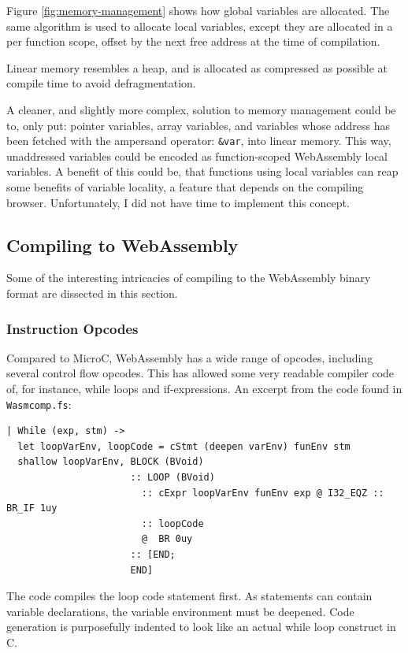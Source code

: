 \documentclass[a4paper]{article}
\begin{document}
Figure \ref{fig:memory-management} shows how global variables are allocated. The same algorithm is used to allocate local variables, except they are allocated in a per function scope, offset by the next free address at the time of compilation.

Linear memory resembles a heap, and is allocated as compressed as possible at compile time to avoid defragmentation.

A cleaner, and slightly more complex, solution to memory management could be to, only put: pointer variables, array variables, and variables whose address has been fetched with the ampersand operator: \texttt{\&var}, into linear memory. This way, unaddressed variables could be encoded as function-scoped WebAssembly local variables. A benefit of this could be, that functions using local variables can reap some benefits of variable locality, a feature that depends on the compiling browser. Unfortunately, I did not have time to implement this concept.

\newpage
\subsection{Compiling to WebAssembly}
\label{sec:technical:webassembly}
Some of the interesting intricacies of compiling to the WebAssembly binary format are dissected in this section.

\subsubsection{Instruction Opcodes}
Compared to MicroC, WebAssembly has a wide range of opcodes, including several control flow opcodes. This has allowed some very readable compiler code of, for instance, while loops and if-expressions.
An excerpt from the code found in \texttt{Wasmcomp.fs}:
\begin{verbatim}
| While (exp, stm) ->
  let loopVarEnv, loopCode = cStmt (deepen varEnv) funEnv stm
  shallow loopVarEnv, BLOCK (BVoid)
                      :: LOOP (BVoid)
                        :: cExpr loopVarEnv funEnv exp @ I32_EQZ :: BR_IF 1uy
                        :: loopCode
                        @  BR 0uy
                      :: [END;
                      END]
\end{verbatim}

The code compiles the loop code statement first. As statements can contain variable declarations, the variable environment must be deepened. Code generation is purposefully indented to look like an actual while loop construct in C.
\end{document}
